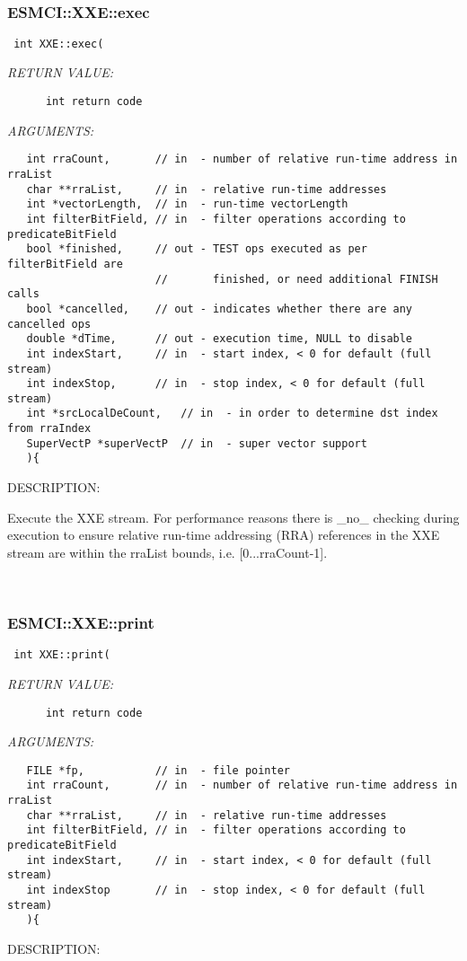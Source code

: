 \mbox{}\hrulefill\
 
\subsubsection [ESMCI::XXE::exec] {ESMCI::XXE::exec}


  
\begin{verbatim} int XXE::exec(\end{verbatim}{\em RETURN VALUE:}
\begin{verbatim}      int return code\end{verbatim}{\em ARGUMENTS:}
\begin{verbatim}   int rraCount,       // in  - number of relative run-time address in rraList
   char **rraList,     // in  - relative run-time addresses
   int *vectorLength,  // in  - run-time vectorLength
   int filterBitField, // in  - filter operations according to predicateBitField
   bool *finished,     // out - TEST ops executed as per filterBitField are
                       //       finished, or need additional FINISH calls
   bool *cancelled,    // out - indicates whether there are any cancelled ops
   double *dTime,      // out - execution time, NULL to disable
   int indexStart,     // in  - start index, < 0 for default (full stream)
   int indexStop,      // in  - stop index, < 0 for default (full stream)
   int *srcLocalDeCount,   // in  - in order to determine dst index from rraIndex
   SuperVectP *superVectP  // in  - super vector support
   ){\end{verbatim}
{\sf DESCRIPTION:\\ }


    Execute the XXE stream. For performance reasons there is _no_ checking
    during execution to ensure relative run-time addressing (RRA) references
    in the XXE stream are within the rraList bounds, i.e. [0...rraCount-1]. 
 
\mbox{}\hrulefill\
 
\subsubsection [ESMCI::XXE::print] {ESMCI::XXE::print}


  
\begin{verbatim} int XXE::print(\end{verbatim}{\em RETURN VALUE:}
\begin{verbatim}      int return code\end{verbatim}{\em ARGUMENTS:}
\begin{verbatim}   FILE *fp,           // in  - file pointer
   int rraCount,       // in  - number of relative run-time address in rraList
   char **rraList,     // in  - relative run-time addresses
   int filterBitField, // in  - filter operations according to predicateBitField
   int indexStart,     // in  - start index, < 0 for default (full stream)
   int indexStop       // in  - stop index, < 0 for default (full stream)
   ){\end{verbatim}
{\sf DESCRIPTION:\\ }


